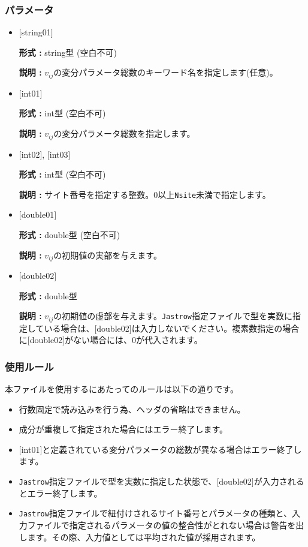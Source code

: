 \subsubsection{パラメータ}
 \begin{itemize}

   \item  $[$string01$]$
   
    {\bf 形式 :} string型 (空白不可)

   {\bf 説明 :} $v_{ij}$の変分パラメータ総数のキーワード名を指定します(任意)。

   \item  $[$int01$]$
   
    {\bf 形式 :} int型 (空白不可)

   {\bf 説明 :} $v_{ij}$の変分パラメータ総数を指定します。

  \item  $[$int02$]$, $[$int03$]$
  
 {\bf 形式 :} int型 (空白不可)

{\bf 説明 :} サイト番号を指定する整数。0以上\verb|Nsite|{未満}で指定します。
 
 \item  $[$double01$]$
   
   {\bf 形式 :} double型 (空白不可)

  {\bf 説明 :} $v_{ij}$の初期値の実部を与えます。
  
 \item  $[$double02$]$
   
   {\bf 形式 :} double型 

  {\bf 説明 :} $v_{ij}$の初期値の虚部を与えます。\verb|Jastrow|指定ファイルで型を実数に指定している場合は、$[$double02$]$は入力しないでください。複素数指定の場合に$[$double02$]$がない場合には、0が代入されます。
  
\end{itemize}

\subsubsection{使用ルール}
本ファイルを使用するにあたってのルールは以下の通りです。
\begin{itemize}
\item 行数固定で読み込みを行う為、ヘッダの省略はできません。
\item 成分が重複して指定された場合にはエラー終了します。
\item $[$int01$]$と定義されている変分パラメータの総数が異なる場合はエラー終了します。
\item  \verb|Jastrow|指定ファイルで型を実数に指定した状態で、$[$double02$]$が入力されるとエラー終了します。
\item \verb|Jastrow|指定ファイルで紐付けされるサイト番号とパラメータの種類と、入力ファイルで指定されるパラメータの値の整合性がとれない場合は警告を出します。その際、入力値としては平均された値が採用されます。
\end{itemize}

